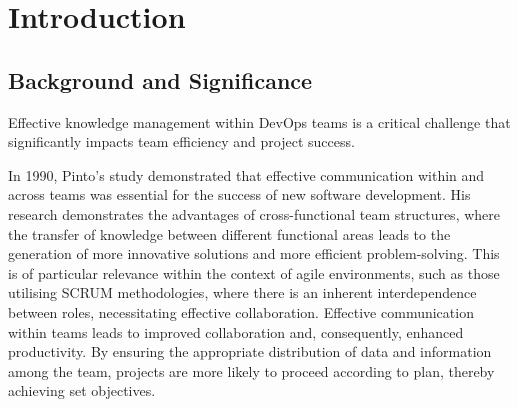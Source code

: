 



\chapter{Introduction} %
\label{Chapter1} %


\newcommand{\keyword}[1]{\textbf{#1}}
\newcommand{\tabhead}[1]{\textbf{#1}}
\newcommand{\code}[1]{\texttt{#1}}
\newcommand{\file}[1]{\texttt{\bfseries#1}}
\newcommand{\option}[1]{\texttt{\itshape#1}}





\section{Background and Significance}

Effective knowledge management within \ac{DevOps} teams is a critical challenge that significantly impacts team efficiency and project success.

In 1990, Pinto's study \cite{Pinto1990} demonstrated that effective communication within and across teams was essential for the success of new software development. His research demonstrates the advantages of cross-functional team structures, where the transfer of knowledge between different functional areas leads to the generation of more innovative solutions and more efficient problem-solving. This is of particular relevance within the context of agile environments, such as those utilising \ac{SCRUM} methodologies, where there is an inherent interdependence between roles, necessitating effective collaboration. Effective communication within teams leads to improved collaboration and, consequently, enhanced productivity. By ensuring the appropriate distribution of data and information among the team, projects are more likely to proceed according to plan, thereby achieving set objectives.

